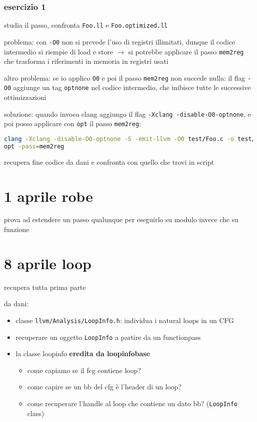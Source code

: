 \section{esercizio 1}

studia il passo, confronta \lstinline|Foo.ll| e \lstinline|Foo.optimized.ll|

\begin{emphasize-blue}
    problema: con \lstinline|-O0| non si prevede l'uso di registri illimitati, dunque il codice intermedio si riempie di load e store $\rightarrow$ si potrebbe applicare il passo \lstinline|mem2reg| che trasforma i riferimenti in memoria in registri usati

    altro problema: se io applico \lstinline|O0| e poi il passo \lstinline|mem2reg| non succede nulla: il flag \lstinline|-O0| aggiunge un tag \lstinline|optnone| nel codice intermedio, che inibisce tutte le successive ottimizzazioni

    soluzione: quando invoco clang aggiungo il flag \lstinline|-Xclang -disable-O0-optnone|, e poi posso applicare con \lstinline|opt| il passo \lstinline|mem2reg|:
    \begin{lstlisting}[language=bash]
clang -Xclang -disable-O0-optnone -S -emit-llvm -O0 test/Foo.c -o test/Foo.ll
opt -pass=mem2reg \end{lstlisting}
   
recupera fine codice da dani e confronta con quello che trovi in script
\end{emphasize-blue}

\part{1 aprile robe}

prova ad estendere un passo qualunque per eseguirlo su modulo invece che su funzione

\part{8 aprile loop}

recupera tutta prima parte

da dani:

\begin{itemize}
  \item classe \lstinline|llvm/Analysis/LoopInfo.h|: individua i natural loops in un CFG
  \item recuperare un oggetto \lstinline|LoopInfo| a partire da un functionpass
  \item la classe loopinfo \textbf{eredita da loopinfobase}
  \begin{itemize}
    \item come capiamo se il fcg contiene loop?
    \item come capire se un bb del cfg \`e l'header di un loop?
    \item come recuperare l'handle al loop che contiene un dato bb? (\lstinline|LoopInfo|  class)
  \end{itemize}
\end{itemize}

